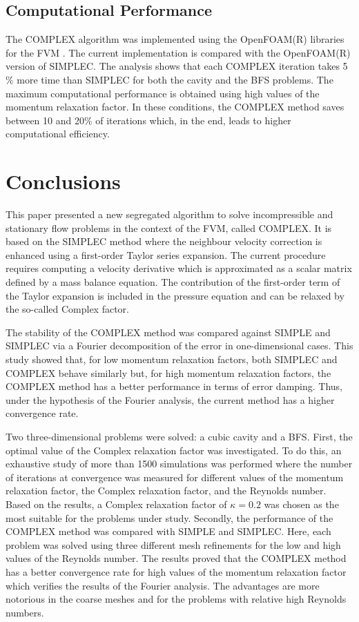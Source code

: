 \documentclass[final,3p,times,11pt,onecolumn]{myElsarticle}
\numberwithin{equation}{section}
\begin{document}
\subsection{Computational Performance}

The COMPLEX algorithm was implemented using the OpenFOAM(R) libraries for the FVM \cite{ofpg}. The current implementation is compared with the OpenFOAM(R) version of SIMPLEC. The analysis shows that each COMPLEX iteration takes 5$\%$ more time than SIMPLEC for both the cavity and the BFS problems. The maximum computational performance is obtained using high values of the momentum relaxation factor. In these conditions, the COMPLEX method saves between 10 and 20$\%$ of iterations which, in the end, leads to higher computational efficiency.

\section{Conclusions}
\label{sec:conclusions}
This paper presented a new segregated algorithm to solve incompressible and stationary flow problems in the context of the FVM, called COMPLEX. It is based on the SIMPLEC method where the neighbour velocity correction is enhanced using a first-order Taylor series expansion. The current procedure requires computing a velocity derivative which is approximated as a scalar matrix defined by a mass balance equation. The contribution of the first-order term of the Taylor expansion is included in the pressure equation and can be relaxed by the so-called Complex factor.

The stability of the COMPLEX method was compared against SIMPLE and SIMPLEC via a Fourier decomposition of the error in one-dimensional cases. This study showed that, for low momentum relaxation factors, both SIMPLEC and COMPLEX behave similarly but, for high momentum relaxation factors, the COMPLEX method has a better performance in terms of error damping. Thus, under the hypothesis of the Fourier analysis, the current method has a higher convergence rate.

Two three-dimensional problems were solved: a cubic cavity and a BFS. First, the optimal value of the Complex relaxation factor was investigated. To do this, an exhaustive study of more than 1500 simulations was performed where the number of iterations at convergence was measured for different values of the momentum relaxation factor, the Complex relaxation factor, and the Reynolds number. Based on the results, a Complex relaxation factor of $\kappa = 0.2$ was chosen as the most suitable for the problems under study. Secondly, the performance of the COMPLEX method was compared with SIMPLE and SIMPLEC. Here, each problem was solved using three different mesh refinements for the low and high values of the Reynolds number. The results proved that the COMPLEX method has a better convergence rate for high values of the momentum relaxation factor which verifies the results of the Fourier analysis. The advantages are more notorious in the coarse meshes and for the problems with relative high Reynolds numbers. %
\end{document}
